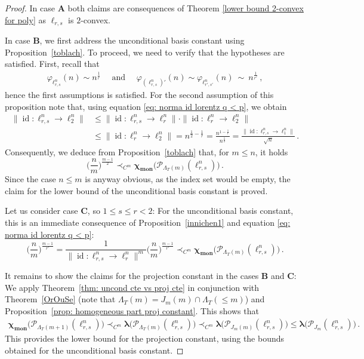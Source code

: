 \documentclass[12pt]{amsart}
\numberwithin{subsection}{section}
\theoremstyle{definition}
\theoremstyle{remark}
\DeclareMathOperator{\mon}{mon}
\DeclareMathOperator{\id}{\mathrm{id}}
\newcommand{\chimon}{\chi_{\mon}}
\begin{document}
\begin{proof}
In case $\mathbf{A}$ both claims are consequences of Theorem \ref{lower bound 2-convex for poly} as $\ell_{r,s}$ is $2$-convex.

In case $\mathbf{B}$, we first address the unconditional basis constant using Proposition~\ref{toblach}. To proceed, we need
to verify that the hypotheses are satisfied. First, recall that
\begin{align} \label{fundfunc}
\varphi_{\ell_{r,s}^n}(n) \sim n^{\frac{1}{r}} \,\,\,\,\,\,\,\,
\text{and} \,\,\,\,\,\,\,\,
\varphi_{(\ell_{r,s}^n)'}(n) \sim \varphi_{\ell_{r',s'}^n}(n)~\sim~n^{\frac{1}{r'}}\,,
\end{align}
hence the first assumptions is satisfied. For the second assumption of this proposition note that, using equation
\eqref{eq: norma id lorentz q < p}, we obtain
\begin{align*}
\|\id \colon \ell_{r,s}^n \to \ell_2^n\| & \leq \|\id\colon \ell_{r,s}^n \to \ell_r^n\| \cdot \|\id \colon \ell_r^n \to \ell_2^n\| \\
& \leq  \|\id \colon \ell_{r}^n \to \ell_2^n\| = n^{\frac{1}{2}-\frac{1}{r}}
= \frac{n^{1-\frac{1}{r} } }{n^{\frac{1}{2} } } =\frac{\|\id \colon \ell_{r,s}^n \to \ell_1^n\|}{\sqrt{n}}\,. \nonumber
\end{align*}
Consequently, we deduce from Proposition~\ref{toblach} that, for $m \leq n$, it holds
\[
\Big(\frac{n}{m}\Big)^{\frac{m-1}{2}}
\prec_{C^m}
\boldsymbol{\chimon}\big( \mathcal{P}_{\Lambda_T(m)}(\ell_{r,s}^n)\big)\,.
\]
Since the case $n \leq m$ is anyway obvious, as the index set would be empty, the claim for the lower bound of the unconditional
basis constant is proved.

Let us consider  case $\mathbf{C}$, so $1\le s \leq r<2$:  For the unconditional basis constant, this is an immediate consequence
of Proposition~\ref{innichen1} and equation
\eqref{eq: norma id lorentz q < p}:
\[
\Big( \frac{n}{m} \Big)^{\frac{m-1}{r'}} = \frac{1}{\|\id\colon \ell_{r,s}^n\to \ell_r^n\|^m} \Big( \frac{n}{m} \Big)^{\frac{m-1}{r'}}
\prec_{C^m} \boldsymbol{\chimon}\big(\mathcal{P}_{\Lambda_T(m)}(\ell_{r,s}^n)\big)\,.
\]

It remains to show the claims for the projection constant in the cases $\mathbf{B}$ and $\mathbf{C}$:
We apply Theorem~\ref{thm: uncond cte vs proj cte} in conjunction with Theorem~\ref{OrOuSe} (note that $\Lambda_T(m) = J_m(m)\cap  \Lambda_T(\leq m)$) and Proposition~\ref{prop: homogeneous part proj constant}. This shows that
\begin{align}\label{end}
\boldsymbol{\chimon}\big(\mathcal{P}_{\Lambda_T(m+1)}(\ell_{r,s}^n)\big)
\prec_{C^m} \boldsymbol{\lambda}\big(\mathcal{P}_{\Lambda_T(m)}(\ell_{r,s}^n)\big)
\prec_{C^m}
\boldsymbol{\lambda}\big(\mathcal{P}_{J_m(m)}(\ell_{r,s}^n)\big)
\leq \boldsymbol{\lambda}\big(\mathcal{P}_{J_m}(\ell_{r,s}^n)\big)\,.
\end{align}
This provides the lower bound for the projection constant, using the bounds obtained for the unconditional basis constant.


\end{proof}
\end{document}
